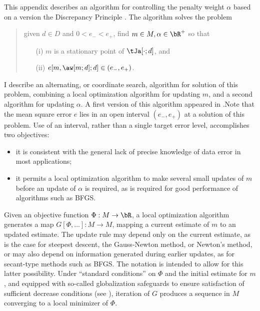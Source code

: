 


This appendix describes an algorithm for controlling the penalty
weight $\alpha$ based on a version the Discrepancy Principle
\cite[]{EnglHankeNeubauer,Hanke:17,FuSymes2017discrepancy}. 
The algorithm solves the problem
\begin{quote}
  \label{eqn:probmod}
  given $d \in D$ and $0 < e_- < e_+$,  find  $m \in M, \alpha \in \bR^+$ so that
  \begin{itemize}
  \item[(i) ]$m$ is a stationary point of $\tJa[\cdot;d]$, and
  \item[(ii) ]$e[m,\aw[m;d];d] \in (e_-,e_+)$.
  \end{itemize}
\end{quote} 
I describe an alternating, or coordinate search, algorithm for
solution of this problem, combining a local optimization
algorithm for updating $m$, and a second algorithm for updating
$\alpha$. A first version of this algorithm appeared in \cite{FuSymes2017discrepancy}.Note that the mean square error $e$ lies in an open interval $(e_-,e_+)$ at a solution of this problem. Use of an interval, rather than a single target error level, accomplishes two objectives:
\begin{itemize}
    \item it is consistent with the general lack of precise knowledge of data error in most applications;
    \item it permits a local optimization algorithm to make several small updates of $m$ before an update of $\alpha$ is required, as is required for good performance of algorithms such as BFGS.
\end{itemize}

Given an
objective function $\Phi: M \rightarrow \bR$, a local optimization algorithm 
generates a map $G[\Phi,...]: M \rightarrow M$, mapping a current estimate
of $m$ to an updated estimate. The update rule may depend only on the
current estimate, as is the case for steepest descent, the
Gauss-Newton method, or Newton's method, or may also depend on
information generated during earlier updates, as for secant-type
methods such as BFGS. The notation is intended to allow for this
latter possibility. Under ``standard conditions'' on $\Phi$ and the initial estimate for
$m$, and equipped with so-called globalization safeguards to ensure
satisfaction of sufficient decrease conditions
(see \cite{NocedalWright}), iteration of $G$ produces a sequence in $M$
converging to a local minimizer of $\Phi$. 

